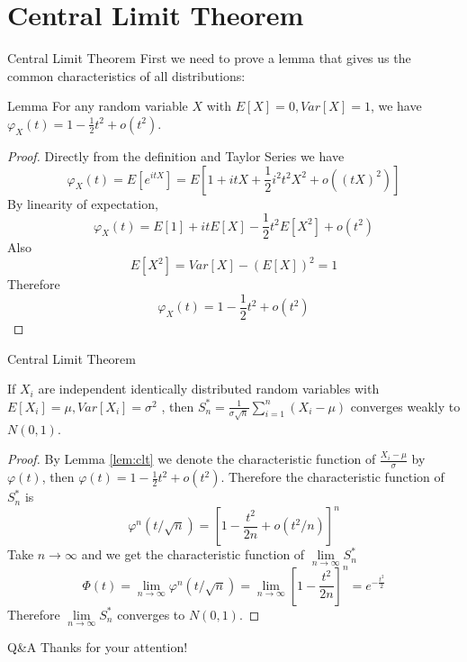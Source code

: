 \documentclass{beamer}
\begin{document}
\section{Central Limit Theorem}
\begin{frame}{Central Limit Theorem}
	First we need to prove a lemma that gives us the common characteristics of all distributions:
	\begin{block}{Lemma}
		For any random variable $X$ with $E[X]=0,Var[X]=1$, we have $\varphi_X(t)=1-\frac12t^2+o(t^2)$.
		\label{lem:clt}
	\end{block}
\end{frame}
\begin{frame}
	\begin{proof}
		Directly from the definition and Taylor Series we have
		$$\varphi_X(t)=E[e^{itX}]=E[1+itX+\frac12i^2t^2X^2+o((tX)^2)]$$
		By linearity of expectation,
		$$\varphi_X(t)=E[1]+itE[X]-\frac12t^2E[X^2]+o(t^2)$$
		Also
		$$E[X^2]=Var[X]-(E[X])^2=1$$
		Therefore $$\varphi_X(t)=1-\frac12t^2+o(t^2)$$
	\end{proof}
\end{frame}
\begin{frame}{Central Limit Theorem}
\begin{theorem}
	If $X_i$ are independent identically distributed random variables with $E[X_i] = \mu, Var[X_i] = \sigma^2$ , then $S_n^* = \frac1{\sigma\sqrt n}\sum_{i=1}^n(X_i-\mu)$ converges weakly to $N(0, 1)$.
	\label{thm:clt}
\end{theorem}
\end{frame}
\begin{frame}
\begin{proof}
	By Lemma \ref{lem:clt} we denote the characteristic function of $\frac{X_i-\mu}{\sigma}$ by $\varphi(t)$, then  $\varphi(t)=1-\frac12t^2+o(t^2)$. Therefore the characteristic function of $S_n^*$ is 
	$$\varphi^n(t/\sqrt{n})=[1-\frac{t^2}{2n}+o(t^2/n)]^n$$
	Take $n\to\infty$ and we get the characteristic function of $\lim\limits_{n\to\infty}S^*_n$
	$$\varPhi(t)=\lim\limits_{n\to\infty}\varphi^n(t/\sqrt{n})
	=\lim\limits_{n\to\infty}[1-\frac{t^2}{2n}]^n=e^{-\frac{t^2}2}$$
	Therefore $\lim\limits_{n\to\infty}S_n^*$ converges to $N(0,1)$.
\end{proof}
\end{frame}
\begin{frame}{Q\&A}
	Thanks for your attention!
\end{frame}
\end{document}
